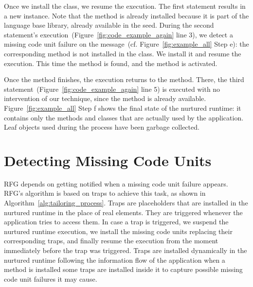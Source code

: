 Once we install the  class, we resume the execution. The first statement results in a new  instance. Note that the  method is already installed because it is part of the language base library, already available in the seed. 
During the second statement's execution~(Figure~\ref{fig:code_example_again} line 3), we detect a missing code unit failure on the  message~(cf. Figure~\ref{fig:example_all} Step e): the corresponding method is not installed in the  class. We install it and resume the execution. This time the method is found, and the  method is activated.



Once the  method finishes, the execution returns to the  method. There, the third statement~(Figure~\ref{fig:code_example_again} line 5) is executed with no intervention of our technique, since the  method is already available. Figure~\ref{fig:example_all} Step f shows the final state of the nurtured runtime: it contains only the methods and classes that are actually used by the application. Leaf objects used during the process have been garbage collected.


\section{Detecting Missing Code Units}\label{sec:model_detail}

RFG depends on getting notified when a missing code unit failure appears. RFG's algorithm is based on traps to achieve this task, as shown in Algorithm~\ref{alg:tailoring_process}. Traps are placeholders that are installed in the nurtured runtime in the place of real elements. They are triggered whenever the application tries to access them. In case a trap is triggered, we suspend the nurtured runtime execution, we install the missing code units replacing their corresponding traps, and finally resume the execution from the moment immediately before the trap was triggered. Traps are installed dynamically in the nurtured runtime following the information flow of the application \eg when a method  is installed some traps are installed inside it to capture possible missing code unit failures it may cause.

